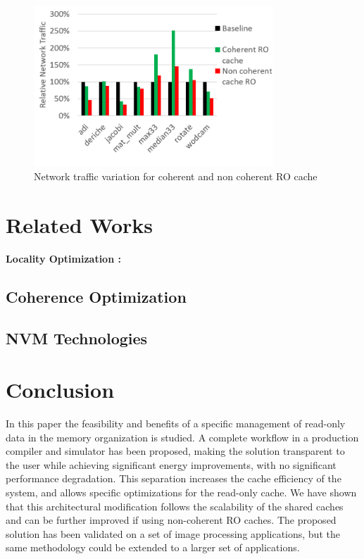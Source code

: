 \documentclass[sigconf]{acmart}
\begin{document}
\begin{figure}
    \centering
    \includegraphics[width=9cm]{./images/resultIncoherent.png}
    \caption{Network traffic variation for coherent and non coherent RO cache}
    \label{resultIncoherent}
\end{figure}

\section{Related Works}

\textbf{Locality Optimization :} 

\subsection{Coherence Optimization}

\subsection{NVM Technologies}

\section{Conclusion}

In this paper the feasibility and benefits of a specific management of read-only data in the memory organization is studied. A complete workflow in a production compiler and simulator has been proposed, making the solution transparent to the user while achieving significant energy improvements, with no significant performance degradation. This separation increases the cache efficiency of the system, and allows specific optimizations for the read-only cache. We have shown that this architectural modification follows the scalability of the shared caches and can be further improved if using non-coherent RO caches. The proposed solution has been validated on a set of image processing applications, but the same methodology could be extended to a larger set of applications. 




 
\end{document}
